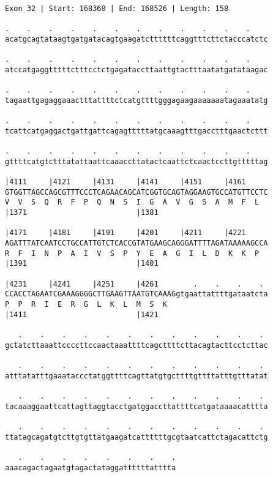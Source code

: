 \documentclass{article}
\begin{document}
\begin{Verbatim}
Exon 32 | Start: 168368 | End: 168526 | Length: 158
 
.    .    .    .    .    .    .    .    .    .    .    .    
acatgcagtataagtgatgatacagtgaagatcttttttcaggtttcttctacccatctc
  
.    .    .    .    .    .    .    .    .    .    .    .    
atccatgaggtttttctttcctctgagataccttaattgtactttaatatgatataagac
  
.    .    .    .    .    .    .    .    .    .    .    .    
tagaattgagaggaaactttattttctcatgttttgggagaagaaaaaaatagaaatatg
  
.    .    .    .    .    .    .    .    .    .    .    .    
tcattcatgaggactgattgattcagagtttttatgcaaagtttgacctttgaactcttt
  
.    .    .    .    .    .    .    .    .    .    .    .    
gttttcatgtctttatattaattcaaaccttatactcaattctcaactccttgtttttag
  
|4111     |4121     |4131     |4141     |4151     |4161     
GTGGTTAGCCAGCGTTTCCCTCAGAACAGCATCGGTGCAGTAGGAAGTGCCATGTTCCTC
V  V  S  Q  R  F  P  Q  N  S  I  G  A  V  G  S  A  M  F  L  
|1371                         |1381                         
  
|4171     |4181     |4191     |4201     |4211     |4221     
AGATTTATCAATCCTGCCATTGTCTCACCGTATGAAGCAGGGATTTTAGATAAAAAGCCA
R  F  I  N  P  A  I  V  S  P  Y  E  A  G  I  L  D  K  K  P  
|1391                         |1401                         
  
|4231     |4241     |4251     |4261        .    .    .    . 
CCACCTAGAATCGAAAGGGGCTTGAAGTTAATGTCAAAGgtgaattattttgataatcta
P  P  R  I  E  R  G  L  K  L  M  S  K                       
|1411                         |1421                         
  
   .    .    .    .    .    .    .    .    .    .    .    . 
gctatcttaaattccccttccaactaaattttcagcttttcttacagtacttcctcttac
  
   .    .    .    .    .    .    .    .    .    .    .    . 
atttatatttgaaataccctatggttttcagttatgtgcttttgttttatttgtttatat
  
   .    .    .    .    .    .    .    .    .    .    .    . 
tacaaaggaattcattagttaggtacctgatggaccttattttcatgataaaacatttta
  
   .    .    .    .    .    .    .    .    .    .    .    . 
ttatagcagatgtcttgtgttatgaagatcattttttgcgtaatcattctagacattctg
  
   .    .    .    .    .    .    .    .
aaacagactagaatgtagactataggattttttatttta
\end{Verbatim}
\end{document}
